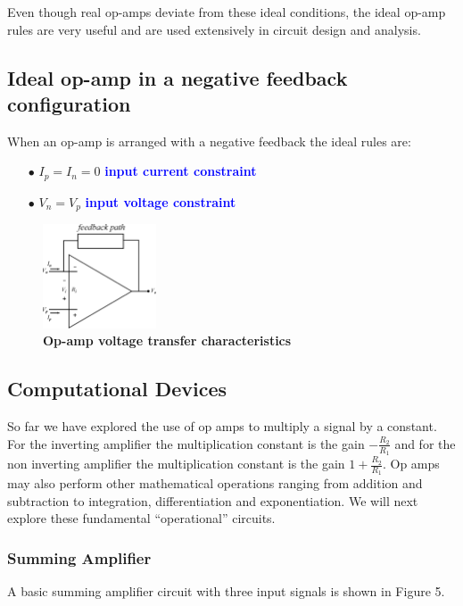 \documentclass[a4 paper]{article}
\newcommand{\blue}[1]{\textcolor{blue}{#1}}
\numberwithin{equation}{section}
\newcommand{\0}{\mathbf{0}}
\begin{document}
Even though real op-amps deviate from these ideal conditions, the ideal op-amp rules are very useful and are used extensively in circuit design and analysis.


\subsection{Ideal op-amp in a negative feedback configuration}


When an op-amp is arranged with a negative feedback the ideal rules are:

\begin{itemize} \itemsep3pt \parskip0pt 
  \item[$\bullet$] $I_p = I_n = 0$ \hspace{8 mm} \blue{\bf input current constraint}
  \item[$\bullet$] $V_n = V_p$ \hspace{13.5 mm} \blue{\bf input voltage constraint}
\end{itemize}


\begin{figure}[!ht]
  \centering
  \includegraphics[width=0.3\textwidth]{./images/circuit2/circuit_append2}
  \caption{{\bf Op-amp voltage transfer characteristics}}
\end{figure}

\subsection{Computational Devices}

So far we have explored the use of op amps to multiply a signal by a constant. For the inverting amplifier the multiplication constant is the gain $-\frac{R_2}{R_1}$ and for the non inverting amplifier the multiplication constant is the gain $1 + \frac{R_2}{R_1}$. Op amps may also perform other mathematical operations ranging from addition and subtraction to integration, differentiation and exponentiation. We will next explore these fundamental ``operational'' circuits.

\subsubsection{Summing Amplifier}
A basic summing amplifier circuit with three input signals is shown in Figure 5.
\end{document}
